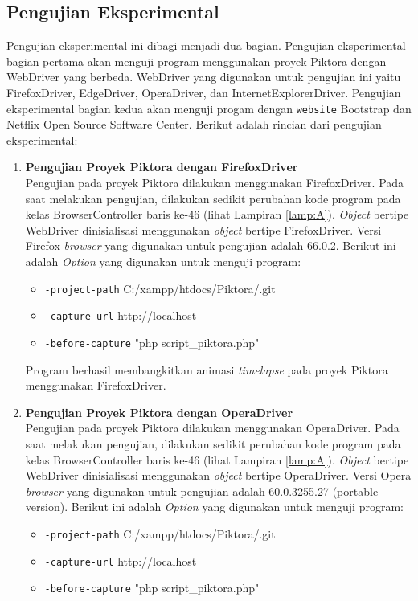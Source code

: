 \subsection{Pengujian Eksperimental}
\label{sec:pengujian_eksperimental} 
Pengujian eksperimental ini dibagi menjadi dua bagian. Pengujian eksperimental bagian pertama akan menguji program menggunakan proyek Piktora dengan WebDriver yang berbeda. WebDriver yang digunakan untuk pengujian ini yaitu FirefoxDriver, EdgeDriver, OperaDriver, dan InternetExplorerDriver. Pengujian eksperimental bagian kedua akan menguji progam dengan \texttt{website} Bootstrap dan Netflix Open Source Software Center. Berikut adalah rincian dari pengujian eksperimental:

\begin{enumerate}
\item \textbf{Pengujian Proyek Piktora dengan FirefoxDriver}\\
Pengujian pada proyek Piktora dilakukan menggunakan FirefoxDriver. Pada saat melakukan pengujian, dilakukan sedikit perubahan kode program pada kelas BrowserController baris ke-46 (lihat Lampiran \ref{lamp:A}). \textit{Object} bertipe WebDriver dinisialisasi menggunakan \textit{object} bertipe FirefoxDriver. Versi Firefox \textit{browser} yang digunakan untuk pengujian adalah 66.0.2. Berikut ini adalah \textit{Option} yang digunakan untuk menguji program:
\begin{itemize}
\item \texttt{-project-path} C:/xampp/htdocs/Piktora/.git
\item \texttt{-capture-url} http://localhost
\item \texttt{-before-capture} "php script\_piktora.php"
\end{itemize}
Program berhasil membangkitkan animasi \textit{timelapse} pada proyek Piktora menggunakan FirefoxDriver.


\item \textbf{Pengujian Proyek Piktora dengan OperaDriver}\\
Pengujian pada proyek Piktora dilakukan menggunakan OperaDriver. Pada saat melakukan pengujian, dilakukan sedikit perubahan kode program pada kelas BrowserController baris ke-46 (lihat Lampiran \ref{lamp:A}). \textit{Object} bertipe WebDriver dinisialisasi menggunakan \textit{object} bertipe OperaDriver. Versi Opera \textit{browser} yang digunakan untuk pengujian adalah 60.0.3255.27 (portable version). Berikut ini adalah \textit{Option} yang digunakan untuk menguji program:
\begin{itemize}
\item \texttt{-project-path} C:/xampp/htdocs/Piktora/.git
\item \texttt{-capture-url} http://localhost
\item \texttt{-before-capture} "php script\_piktora.php"
\end{itemize}


\end{enumerate}
